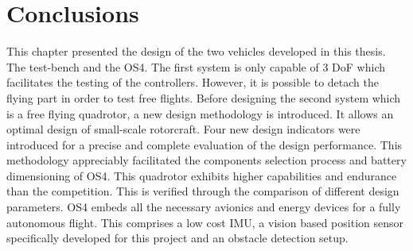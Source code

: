 \section{Conclusions}
This chapter presented the design of the two vehicles developed in this thesis.
The test-bench and the OS4. The first system is only capable of 3 DoF which
facilitates the testing of the controllers. However, it is possible to detach the
flying part in order to test free flights. Before designing the second system
which is a free flying quadrotor, a new design methodology is introduced. It
allows an optimal design of small-scale rotorcraft. Four new design indicators
were introduced for a precise and complete evaluation of the design performance.
This methodology appreciably facilitated the components selection
process and battery dimensioning of OS4. This quadrotor exhibits higher
capabilities and endurance than the competition. This is verified through
the comparison of different design parameters. OS4 embeds all the necessary
avionics and energy devices for a fully autonomous flight. This comprises a
low cost IMU, a vision based position sensor specifically developed for this
project and an obstacle detection setup.

